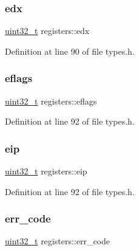 \subsubsection{\texorpdfstring{edx}{edx}}
{\footnotesize\ttfamily \hyperlink{a00140_a435d1572bf3f880d55459d9805097f62_a435d1572bf3f880d55459d9805097f62}{uint32\+\_\+t} registers\+::edx}



Definition at line 90 of file types.\+h.

\mbox{\label{a00264_af9a17981c1cdac71d6f82ba32466a036_af9a17981c1cdac71d6f82ba32466a036}} 
\subsubsection{\texorpdfstring{eflags}{eflags}}
{\footnotesize\ttfamily \hyperlink{a00140_a435d1572bf3f880d55459d9805097f62_a435d1572bf3f880d55459d9805097f62}{uint32\+\_\+t} registers\+::eflags}



Definition at line 92 of file types.\+h.

\mbox{\label{a00264_aaeedf83509826a731e436025aeb53576_aaeedf83509826a731e436025aeb53576}} 
\subsubsection{\texorpdfstring{eip}{eip}}
{\footnotesize\ttfamily \hyperlink{a00140_a435d1572bf3f880d55459d9805097f62_a435d1572bf3f880d55459d9805097f62}{uint32\+\_\+t} registers\+::eip}



Definition at line 92 of file types.\+h.

\mbox{\label{a00264_a1f90b3d484c66002c9ffcd0e54e97c2c_a1f90b3d484c66002c9ffcd0e54e97c2c}} 
\subsubsection{\texorpdfstring{err\+\_\+code}{err\_code}}
{\footnotesize\ttfamily \hyperlink{a00140_a435d1572bf3f880d55459d9805097f62_a435d1572bf3f880d55459d9805097f62}{uint32\+\_\+t} registers\+::err\+\_\+code}



